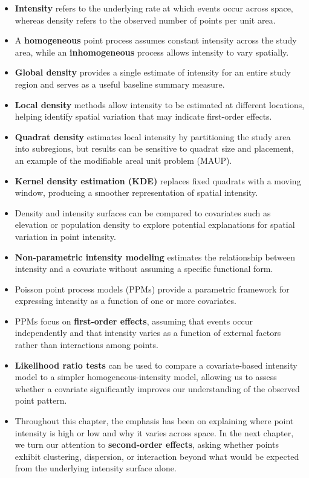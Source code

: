 \documentclass[
  letterpaper,
]{book}
\providecommand{\tightlist}{%
  \setlength{\itemsep}{0pt}\setlength{\parskip}{0pt}}
\begin{document}
\begin{itemize}
\tightlist
\item
  \textbf{Intensity} refers to the underlying rate at which events occur
  across space, whereas density refers to the observed number of points
  per unit area.
\item
  A \textbf{homogeneous} point process assumes constant intensity across
  the study area, while an \textbf{inhomogeneous} process allows
  intensity to vary spatially.
\item
  \textbf{Global density} provides a single estimate of intensity for an
  entire study region and serves as a useful baseline summary measure.
\item
  \textbf{Local density} methods allow intensity to be estimated at
  different locations, helping identify spatial variation that may
  indicate first-order effects.
\item
  \textbf{Quadrat density} estimates local intensity by partitioning the
  study area into subregions, but results can be sensitive to quadrat
  size and placement, an example of the modifiable areal unit problem
  (MAUP).
\item
  \textbf{Kernel density estimation (KDE)} replaces fixed quadrats with
  a moving window, producing a smoother representation of spatial
  intensity.
\item
  Density and intensity surfaces can be compared to covariates such as
  elevation or population density to explore potential explanations for
  spatial variation in point intensity.
\item
  \textbf{Non-parametric intensity modeling} estimates the relationship
  between intensity and a covariate without assuming a specific
  functional form.
\item
  Poisson point process models (PPMs) provide a parametric framework for
  expressing intensity as a function of one or more covariates.
\item
  PPMs focus on \textbf{first-order effects}, assuming that events occur
  independently and that intensity varies as a function of external
  factors rather than interactions among points.
\item
  \textbf{Likelihood ratio tests} can be used to compare a
  covariate-based intensity model to a simpler homogeneous-intensity
  model, allowing us to assess whether a covariate significantly
  improves our understanding of the observed point pattern.
\item
  Throughout this chapter, the emphasis has been on explaining where
  point intensity is high or low and why it varies across space. In the
  next chapter, we turn our attention to \textbf{second-order effects},
  asking whether points exhibit clustering, dispersion, or interaction
  beyond what would be expected from the underlying intensity surface
  alone.
\end{itemize}
\end{document}
